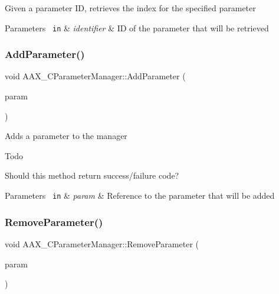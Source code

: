 Given a parameter ID, retrieves the index for the specified parameter


\begin{DoxyParams}[1]{Parameters}
\mbox{\texttt{ in}}  & {\em identifier} & ID of the parameter that will be retrieved \\
\hline
\end{DoxyParams}
\mbox{\label{a01545_ae2f9631b33c012f7a8c042df9655b28c}} 
\subsubsection{\texorpdfstring{AddParameter()}{AddParameter()}}
{\footnotesize\ttfamily void A\+A\+X\+\_\+\+C\+Parameter\+Manager\+::\+Add\+Parameter (\begin{DoxyParamCaption}\item[{\mbox{\hyperlink{a01857}{A\+A\+X\+\_\+\+I\+Parameter}} $\ast$}]{param }\end{DoxyParamCaption})}

Adds a parameter to the manager

\begin{DoxyRefDesc}{Todo}
\item[\mbox{\hyperlink{a00785__todo000021}{Todo}}]Should this method return success/failure code?\end{DoxyRefDesc}



\begin{DoxyParams}[1]{Parameters}
\mbox{\texttt{ in}}  & {\em param} & Reference to the parameter that will be added \\
\hline
\end{DoxyParams}
\mbox{\label{a01545_ac3a21fe1267f8fb276aa08e9f492c5ed}} 
\subsubsection{\texorpdfstring{RemoveParameter()}{RemoveParameter()}}
{\footnotesize\ttfamily void A\+A\+X\+\_\+\+C\+Parameter\+Manager\+::\+Remove\+Parameter (\begin{DoxyParamCaption}\item[{\mbox{\hyperlink{a01857}{A\+A\+X\+\_\+\+I\+Parameter}} $\ast$}]{param }\end{DoxyParamCaption})}

